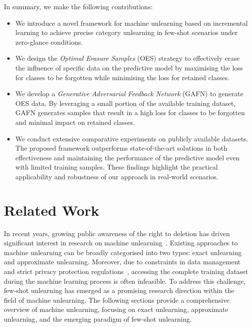 \documentclass[preprint,12pt]{elsarticle}
\begin{document}
In summary, we make the following contributions:

\begin{itemize}
    \item We introduce a novel framework for machine unlearning based on incremental learning to achieve precise category unlearning in few-shot scenarios under zero-glance conditions. 
    
    \item We design the \textit{Optimal Erasure Samples} (OES) strategy to effectively erase the influence of specific data on the predictive model by maximising the loss for classes to be forgotten while minimising the loss for retained classes.
    
    \item We develop a \textit{Generative Adversarial Feedback Network} (GAFN) to generate OES data. By leveraging a small portion of the available training dataset, GAFN generates samples that result in a high loss for classes to be forgotten and minimal impact on retained classes. 
    
    \item We conduct extensive comparative experiments on publicly available datasets. The proposed framework outperforms state-of-the-art solutions in both effectiveness and maintaining the performance of the predictive model even with limited training samples. These findings highlight the practical applicability and robustness of our approach in real-world scenarios.
\end{itemize}

\section{Related Work}
In recent years, growing public awareness of the right to deletion has driven significant interest in research on machine unlearning~\cite{juliussen2023algorithms,chen2021machine,floridi2023machine}. Existing approaches to machine unlearning can be broadly categorised into two types: exact unlearning and approximate unlearning. Moreover, due to constraints in data management and strict privacy protection regulations~\cite{bygrave2010privacy}, accessing the complete training dataset during the machine learning process is often infeasible. To address this challenge, few-shot unlearning has emerged as a promising research direction within the field of machine unlearning. The following sections provide a comprehensive overview of machine unlearning, focusing on exact unlearning, approximate unlearning, and the emerging paradigm of few-shot unlearning.
\end{document}
